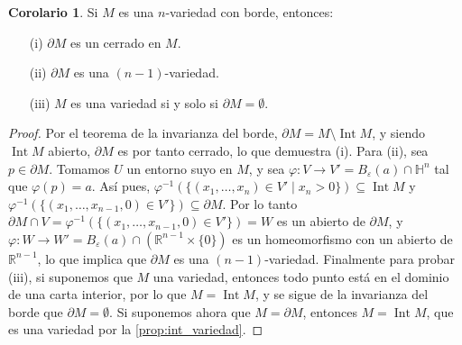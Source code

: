 \documentclass[10pt]{report}
\newcommand{\R}{\mathbb{R}}
\DeclareMathOperator{\interior}{Int} %
\theoremstyle{definition}
\newtheorem{corol}[defin]{Corolario}
\begin{document}
\begin{corol}\label{corol:borde_n-1_variedad}
Si $M$ es una $n$-variedad con borde, entonces:
\begin{itemize}
\item[(i)]  $\partial M$ es un cerrado en $M$.
\item[(ii)] $\partial M$ es una $(n-1)$-variedad. 
\item[(iii)] $M$ es una variedad si y solo si $\partial M=\emptyset$.
\end{itemize}
\end{corol}

\begin{proof}
Por el teorema de la invarianza del borde, $\partial M= M\setminus \interior{M}$, y siendo $\interior{M}$ abierto, $\partial M$ es por tanto cerrado, lo que demuestra (i). 
Para (ii), sea $p\in \partial M$. Tomamos $U$ un entorno suyo en $M$, y sea $\varphi :V\to V'=B_{\varepsilon}(a)\cap \mathbb{H}^n$ tal que $\varphi(p)=a$. Así pues, $\varphi^{-1} (\{(x_1,\dots ,x_n)\in V' \mid x_{n}>0\})\subseteq \interior M$  y $\varphi^{-1} (\{(x_1,\dots ,x_{n-1},0)\in V'\})\subseteq \partial M$. Por lo tanto $\partial M\cap V=\varphi^{-1} (\{(x_1,\dots ,x_{n-1},0)\in V'\})=W$ es un abierto de $\partial M$, y $\varphi : W\to W'=B_{\varepsilon}(a)\cap (\R^{n-1} \times \{ 0\} )$ es un homeomorfismo con un abierto de $\R^{n-1}$, lo que implica que $\partial M$ es una $(n-1)$-variedad.
Finalmente para probar (iii), si suponemos que $M$ una variedad, entonces todo punto está en el dominio de una carta interior, por lo que $M=\interior{M}$, y se sigue de la invarianza del borde que $\partial M=\emptyset$. Si suponemos ahora que $M=\partial M$, entonces $M=\interior{M}$, que es una variedad por la \autoref{prop:int_variedad}.
\end{proof}
\end{document}
